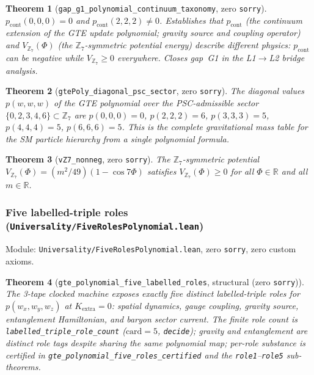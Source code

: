 \documentclass[11pt,a4paper]{article}
\newtheorem{theorem}{Theorem}[section]
\theoremstyle{definition}
\newcommand{\ZS}{\mathbb{Z}_7}
\begin{document}
\begin{theorem}[\lstinline|gap_g1_polynomial_continuum_taxonomy|, zero \texttt{sorry}]
$p_{\mathrm{cont}}(0,0,0)=0$ and $p_{\mathrm{cont}}(2,2,2)\neq 0$.
Establishes that $p_{\mathrm{cont}}$ (the continuum extension of the GTE update
polynomial; gravity source and coupling operator) and $V_{\ZS}(\Phi)$
(the $\mathbb{Z}_7$-symmetric potential energy) describe \emph{different} physics:
$p_{\mathrm{cont}}$ can be negative while $V_{\ZS}\ge 0$ everywhere.
Closes gap~G1 in the L1$\to$L2 bridge analysis.
\end{theorem}

\begin{theorem}[\lstinline|gtePoly_diagonal_psc_sector|, zero \texttt{sorry}]
The diagonal values $p(w,w,w)$ of the GTE polynomial over the PSC-admissible
sector $\{0,2,3,4,6\}\subset\mathbb{Z}_7$ are
$p(0,0,0)=0$, $p(2,2,2)=6$, $p(3,3,3)=5$, $p(4,4,4)=5$, $p(6,6,6)=5$.
This is the complete gravitational mass table for the SM particle hierarchy
from a single polynomial formula.
\end{theorem}

\begin{theorem}[\lstinline|vZ7_nonneg|, zero \texttt{sorry}]
The $\mathbb{Z}_7$-symmetric potential $V_{\ZS}(\Phi)=(m^2/49)(1-\cos 7\Phi)$
satisfies $V_{\ZS}(\Phi)\ge 0$ for all $\Phi\in\mathbb{R}$ and all $m\in\mathbb{R}$.
\end{theorem}

\subsubsection{Five labelled-triple roles
  (\texttt{Universality/FiveRolesPolynomial.lean})}\label{subsubsec:five-roles-polynomial}

Module: \texttt{Universality/FiveRolesPolynomial.lean}, zero \lstinline|sorry|,
zero custom axioms.

\begin{theorem}[\lstinline|gte_polynomial_five_labelled_roles|, structural (zero \texttt{sorry})]
The 3-tape clocked machine exposes exactly five distinct labelled-triple roles for
$p(w_x,w_y,w_z)$ at $K_{\mathrm{extra}}=0$: spatial dynamics, gauge coupling, gravity
source, entanglement Hamiltonian, and baryon sector current.  The finite role count is
\lstinline|labelled_triple_role_count| ($\mathrm{card}=5$, \lstinline|decide|); gravity
and entanglement are distinct role tags despite sharing the same polynomial map; per-role
substance is certified in \lstinline|gte_polynomial_five_roles_certified| and the
\lstinline|role1|--\lstinline|role5| sub-theorems.
\end{theorem}
\end{document}
